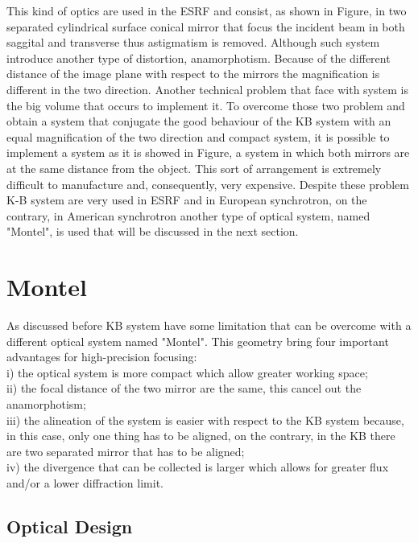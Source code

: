 \hspace{10mm} This kind of optics are used in the ESRF and consist, as shown in Figure, in two separated cylindrical surface conical mirror that focus the incident beam in both saggital and transverse thus astigmatism is removed. Although such system introduce another type of distortion, anamorphotism. Because of the different distance of the image plane with respect to the mirrors the magnification is different in the two direction.  Another technical problem that face with system is the big volume that occurs to implement it.
\noindent To overcome those two problem and obtain a system that conjugate the good behaviour of the KB system with an equal magnification of the two direction and compact system, it is possible to implement a system as it is showed in Figure, a system in which both mirrors are at the same distance from the object. This sort of arrangement is extremely difficult to manufacture and, consequently, very expensive.
\noindent Despite these problem K-B system are very used in ESRF and in European synchrotron, on the contrary, in American synchrotron another type of optical system, named "Montel", is used that will be discussed in the next section.


\section{Montel}

\hspace{10mm} As discussed before KB system have some limitation that can be overcome with a different optical system named "Montel". This geometry bring four important advantages for high-precision focusing: 
\\ i) the optical system is more compact which allow greater working space;
\\ ii) the focal distance of the two mirror are the same, this cancel out  the anamorphotism;
\\ iii) the alineation of the system is easier with respect to the KB system because, in this case, only one thing has to be aligned, on the contrary, in the KB there are two separated mirror that has to be aligned;
\\ iv) the divergence that can be collected is larger which allows for greater flux and/or a lower diffraction limit.

\subsection{Optical Design}

